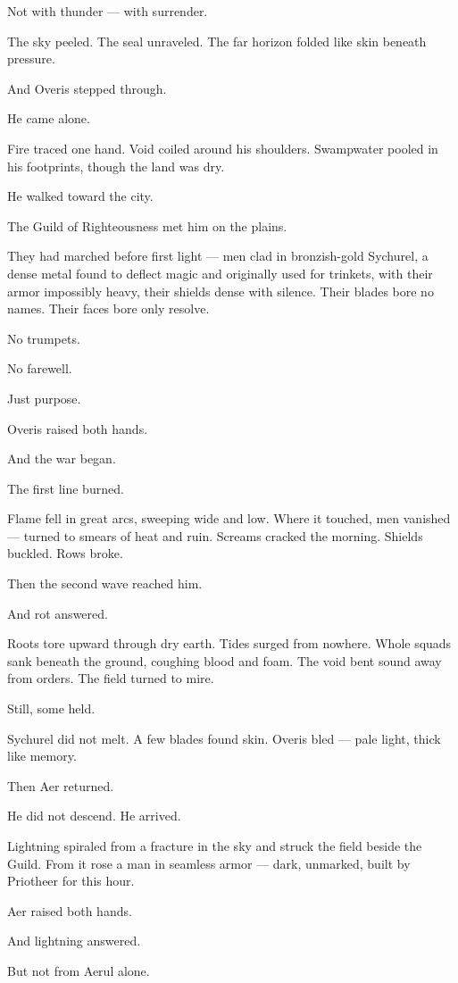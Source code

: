 \documentclass[9pt]{article}
\begin{document}
Not with thunder — with surrender.

The sky peeled. The seal unraveled. The far horizon folded like skin beneath pressure.

And Overis stepped through.

He came alone.

Fire traced one hand. Void coiled around his shoulders. Swampwater pooled in his footprints, though the land was dry.

He walked toward the city.

The Guild of Righteousness met him on the plains.

They had marched before first light — men clad in bronzish-gold Sychurel, a dense metal found to deflect magic and originally used for trinkets, with their armor impossibly heavy, their shields dense with silence. Their blades bore no names. Their faces bore only resolve.

No trumpets.

No farewell.

Just purpose.

Overis raised both hands.

And the war began.

The first line burned.

Flame fell in great arcs, sweeping wide and low. Where it touched, men vanished — turned to smears of heat and ruin. Screams cracked the morning. Shields buckled. Rows broke.

Then the second wave reached him.

And rot answered.

Roots tore upward through dry earth. Tides surged from nowhere. Whole squads sank beneath the ground, coughing blood and foam. The void bent sound away from orders. The field turned to mire.

Still, some held.

Sychurel did not melt. A few blades found skin. Overis bled — pale light, thick like memory.

Then Aer returned.

He did not descend. He arrived.

Lightning spiraled from a fracture in the sky and struck the field beside the Guild. From it rose a man in seamless armor — dark, unmarked, built by Priotheer for this hour.

Aer raised both hands.

And lightning answered.

But not from Aerul alone.
\end{document}
